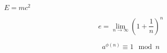 \documentclass[10pt]{book}
\begin{document}
\begin{mdSnippets}
\begin{mdInlineSnippet}[826676a6a5ad24552f0d5af1593434cc]%
$E=mc^2$\end{mdInlineSnippet}%
\begin{mdDisplaySnippet}[3ddeeecfa9b7b38221c376ed4d89a66b]%
\[%
  e = \lim_{n\rightarrow\infty} (1+\frac1n)^n
\]%
\end{mdDisplaySnippet}%
\begin{mdDisplaySnippet}[d87c37accdb98b2b25c0c31e6b0eb368]%
\[%
  a^{\phi(n)} \equiv1 \mod n
\]%
\end{mdDisplaySnippet}%

\end{mdSnippets}
\end{document}
